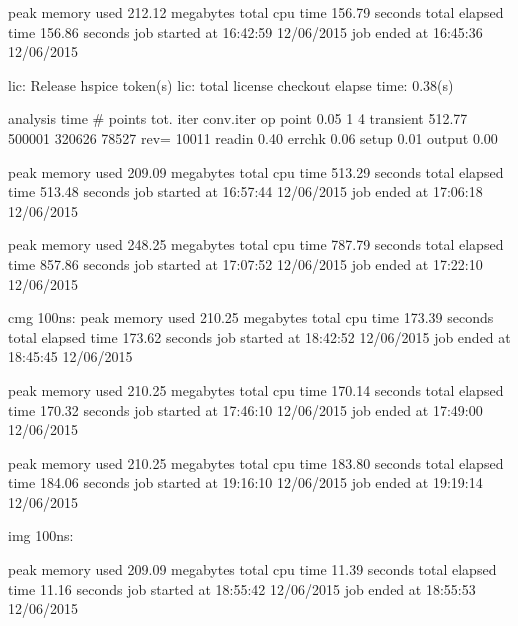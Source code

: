            peak memory used        212.12 megabytes
           total cpu time          156.79 seconds
           total elapsed time      156.86 seconds
           job started at     16:42:59 12/06/2015
           job ended   at     16:45:36 12/06/2015


 lic: Release hspice token(s) 
 lic: total license checkout elapse time:        0.38(s)     
 
 
 
  analysis           time    # points   tot. iter  conv.iter
  op point           0.05           1           4
  transient        512.77      500001      320626       78527 rev=     10011
  readin             0.40
  errchk             0.06
  setup              0.01
  output             0.00


           peak memory used        209.09 megabytes
           total cpu time          513.29 seconds
           total elapsed time      513.48 seconds
           job started at     16:57:44 12/06/2015
           job ended   at     17:06:18 12/06/2015      
           
           
                      peak memory used        248.25 megabytes
           total cpu time          787.79 seconds
           total elapsed time      857.86 seconds
           job started at     17:07:52 12/06/2015
           job ended   at     17:22:10 12/06/2015
           
cmg 100ns:           
           peak memory used        210.25 megabytes
           total cpu time          173.39 seconds
           total elapsed time      173.62 seconds
           job started at     18:42:52 12/06/2015
           job ended   at     18:45:45 12/06/2015
           
                      peak memory used        210.25 megabytes
           total cpu time          170.14 seconds
           total elapsed time      170.32 seconds
           job started at     17:46:10 12/06/2015
           job ended   at     17:49:00 12/06/2015    
           
           peak memory used        210.25 megabytes
           total cpu time          183.80 seconds
           total elapsed time      184.06 seconds
           job started at     19:16:10 12/06/2015
           job ended   at     19:19:14 12/06/2015           
           
img 100ns:

           peak memory used        209.09 megabytes
           total cpu time           11.39 seconds
           total elapsed time       11.16 seconds
           job started at     18:55:42 12/06/2015
           job ended   at     18:55:53 12/06/2015                  
